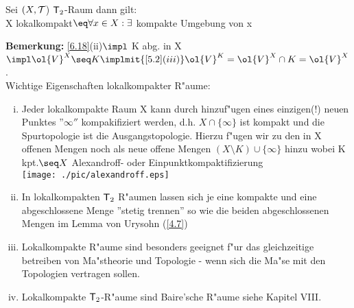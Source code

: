 \begin{prop}\label{6.18}
Sei $(X,\mathcal T$) $\mbox{\sf T}_2$-Raum dann gilt:\\
X lokalkompakt$\eq \forall x\in X:\exists $ kompakte Umgebung von x
\end{prop}
{\bf Bemerkung:} \ref{6.18}(ii)$\impl$ K abg. in X$\impl \ol{V}^X\seq K\implmit{\ref{5.2}(iii)} \ol{V}^K =\ol{V}^X\cap K =\ol{V}^X$.\\
Wichtige Eigenschaften lokalkompakter R"aume:
\begin{enumerate}[(i)]
\item Jeder lokalkompakte Raum X kann durch hinzuf"ugen eines einzigen(!) neuen Punktes ''$\infty''$ kompakifiziert werden, d.h. $X\cap\{\infty\}$ ist kompakt und die Spurtopologie ist die Ausgangstopologie. Hierzu f"ugen wir zu den in X offenen Mengen noch als neue offene Mengen $(X\setminus K)\cup \{\infty\}$ hinzu wobei K kpt.$\seq X$ {\sc Alexandroff}- oder Einpunktkompaktifizierung\\
\texttt{[image: ./pic/alexandroff.eps]}\\
\item In lokalkompakten $\mbox{\sf T}_2$ R"aumen lassen sich je eine kompakte und eine abgeschlossene Menge ''stetig trennen'' so wie die beiden abgeschlossenen Mengen im {\sc Lemma von Urysohn} (\ref{4.7})
\item Lokalkompakte R"aume sind besonders geeignet f"ur das gleichzeitige betreiben von Ma"stheorie und Topologie - wenn sich die Ma"se mit den Topologien vertragen sollen.
\item Lokalkompakte $\mbox{\sf T}_2$-R"aume sind {\sc Baire}'sche R"aume siehe Kapitel VIII.
\end{enumerate}

